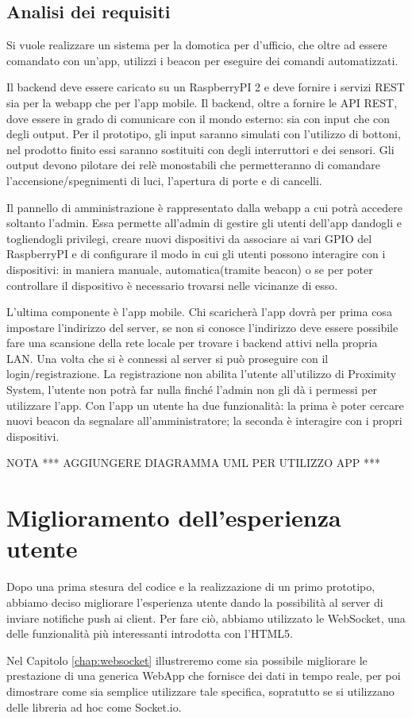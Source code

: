 \subsection{Analisi dei requisiti}
Si vuole realizzare un sistema per la domotica per d'ufficio, che oltre ad essere comandato con un'app, utilizzi i beacon per eseguire dei comandi automatizzati.

Il backend deve essere caricato su un RaspberryPI 2 e deve fornire i servizi REST sia per la webapp che per l'app mobile. 
Il backend, oltre a fornire le API REST, dove essere in grado di comunicare con il mondo esterno: sia con input che con degli output.
Per il prototipo, gli input saranno simulati con l'utilizzo di bottoni, nel prodotto finito essi saranno sostituiti con degli interruttori e dei sensori.
Gli output devono pilotare dei relè monostabili che permetteranno di comandare l'accensione/spegnimenti di luci, l'apertura di porte e di cancelli.

Il pannello di amministrazione è rappresentato dalla webapp a cui potrà accedere soltanto l'admin. 
Essa permette all'admin di gestire gli utenti dell'app dandogli e togliendogli privilegi, creare nuovi dispositivi da associare ai vari GPIO del RaspberryPI e   di configurare il modo in cui gli utenti possono interagire con i dispositivi: in maniera manuale, automatica(tramite beacon) o se per poter controllare il dispositivo è necessario trovarsi nelle vicinanze di esso. 

L'ultima componente è l'app mobile. 
Chi scaricherà l'app dovrà per prima cosa impostare l'indirizzo del server, se non si conosce l'indirizzo deve essere possibile fare una scansione della rete locale per trovare i backend attivi nella propria LAN. 
Una volta che si è connessi al server si può proseguire con il login/registrazione. La registrazione non abilita l'utente all'utilizzo di Proximity System, l'utente non potrà far nulla finché l'admin non gli dà i permessi per utilizzare l'app. 
Con l'app un utente ha due funzionalità: la prima è poter cercare nuovi beacon da segnalare all'amministratore; la seconda è interagire con i propri dispositivi.

{\Huge NOTA *** AGGIUNGERE DIAGRAMMA UML PER UTILIZZO APP ***}

\section{Miglioramento dell'esperienza utente}
Dopo una prima stesura del codice e la realizzazione di un primo prototipo,
abbiamo deciso migliorare l'esperienza utente dando la possibilità al server di inviare notifiche push ai client.
Per fare ciò, abbiamo utilizzato le WebSocket, una delle funzionalità più interessanti introdotta con l'HTML5.

Nel Capitolo \ref{chap:websocket} illustreremo come sia possibile migliorare le  prestazione di una generica WebApp che fornisce dei dati in tempo reale, per poi dimostrare come sia semplice utilizzare tale specifica, sopratutto se si utilizzano delle libreria ad hoc come Socket.io. 